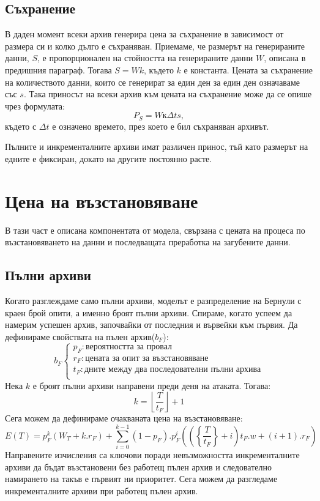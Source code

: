 \documentclass[11pt, a4paper]{article}
\theoremstyle{definition}
\begin{document}
	\subsection{Съхранение}
		В даден момент всеки архив генерира цена за съхранение в зависимост от размера си и колко дълго е съхраняван. Приемаме, че размерът на генерираните данни, $S$, е пропорционален на стойността на генерираните данни $W$, описана в предишния параграф. Тогава $S=Wk$, където $k$ е константа. Цената за съхранение на количеството данни, които се генерират за един ден за един ден означаваме със $s$. Така приносът на всеки архив към цената на съхранение може да се опише чрез формулата:
		$$
			P_S = Wк\Delta ts,
		$$
		където с $\Delta t$ е означено времето, през което е бил съхраняван архивът.\par\noindent
		Пълните и инкременталните архиви имат различен принос, тъй като размерът на едните е фиксиран, докато на другите постоянно расте.
\section{Цена на възстановяване}
	В тази част е описана компонентата от модела, свързана с цената на процеса по възстановяването на данни и последващата преработка на загубените данни.
	\subsection{Пълни архиви}
				Когато разглеждаме само пълни архиви, моделът е разпределение на Бернули с краен брой опити, а именно броят пълни архиви. Спираме, когато успеем да намерим успешен архив, започвайки от последния и вървейки към първия. Да дефинираме свойствата на пълен архив($b_F$):
				$$
				b_F
				\begin{cases}
				p_F: \text{вероятността за провал}\\
				r_F: \text{цената за опит за възстановяване}\\
				t_F: \text{дните между два последователни пълни архива}\\
				\end{cases}
				$$
				Нека $k$ е броят пълни архиви направени преди деня на атаката. Тогава:
				$$
				k = \left \lfloor{\frac{T}{t_F}}\right \rfloor + 1
				$$
				Сега можем да дефинираме очакваната цена на възстановяване:
				\begin{equation}
					\label{eq:1}
					E(T) = p_F^{k}\left(W_T + k.r_F\right) + \displaystyle \sum_{i=0}^{k-1} 	(1-p_F).p_F^{i}\left( \left (\left\{ \frac{T}{t_F}\right \} + i\right)t_F.w + (i+1).r_F \right )
				\end{equation}
				Направените изчисления са ключови поради невъзможността инкременталните архиви да бъдат възстановени без работещ пълен архив и следователно намирането на такъв е първият ни приоритет. Сега можем да разгледаме инкременталните архиви при работещ пълен архив.
\end{document}
